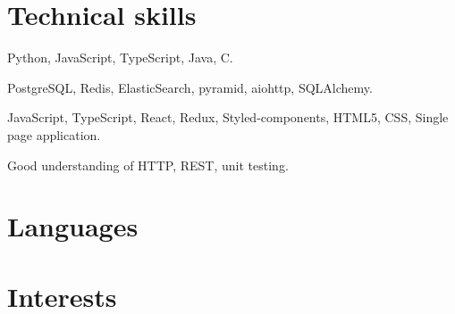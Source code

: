 \documentclass[11pt,a4paper,roman]{moderncv}
\begin{document}
\section{Technical skills}


       {Python, JavaScript, TypeScript, Java, C.}

       {PostgreSQL, Redis, ElasticSearch, pyramid, aiohttp, SQLAlchemy.}

       {JavaScript, TypeScript, React, Redux, Styled-components,}
\cvitem{}
       {HTML5, CSS, Single page application.}

       {Good understanding of HTTP, REST, unit testing.}
    
\medskip


%
%

\section{Languages}

\medskip

\section{Interests}
\end{document}
